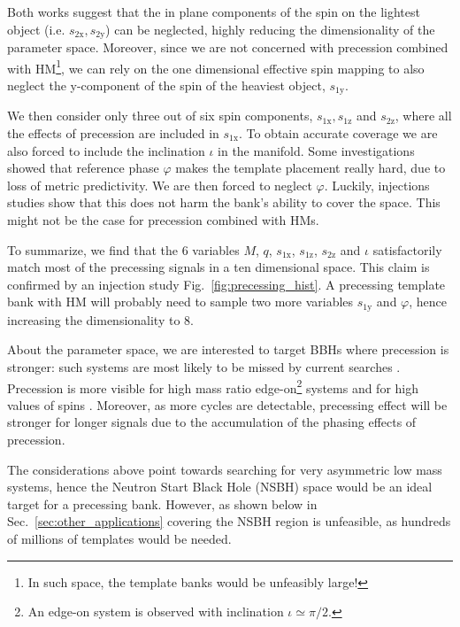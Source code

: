 \documentclass[twocolumn,showpacs,preprintnumbers,nofootinbib,prd,
superscriptaddress,10pt]{revtex4-2}
\begin{document}
Both works suggest that the in plane components of the spin on the lightest object (i.e. $s_\text{2x}, s_\text{2y}$) can be neglected, highly reducing the dimensionality of the parameter space.
Moreover, since we are not concerned with precession combined with HM\footnote{In such space, the template banks would be unfeasibly large!}, we can rely on the one dimensional effective spin mapping \cite{Schmidt:2014iyl} to also neglect the y-component of the spin of the heaviest object, $s_\text{1y}$.

We then consider only three out of six spin components, $s_\text{1x}, s_\text{1z}$ and $s_\text{2z}$, where all the effects of precession are included in $s_\text{1x}$. To obtain accurate coverage we are also forced to include the inclination $\iota$ in the manifold. Some investigations showed that reference phase $\varphi$ makes the template placement really hard, due to loss of metric predictivity.
We are then forced to neglect $\varphi$. Luckily, injections studies show that this does not harm the bank's ability to cover the space. This might not be the case for precession combined with HMs.

To summarize, we find that the $6$ variables $M$, $q$, $s_\text{1x}$, $s_\text{1z}$, $s_\text{2z}$ and $\iota$ satisfactorily match most of the precessing signals in a ten dimensional space.
This claim is confirmed by an injection study Fig.~\ref{fig:precessing_hist}.
A precessing template bank with HM will probably need to sample two more variables $s_\text{1y}$ and $\varphi$, hence increasing the dimensionality to $8$.

About the parameter space, we are interested to target BBHs where precession is stronger: such systems are most likely to be missed by current searches \cite{PhysRevD.102.041302, Fairhurst:2019vut}.
Precession is more visible for high mass ratio edge-on\footnote{An edge-on system is observed with inclination $\iota\simeq \pi/2$.} systems and for high values of spins \cite{CalderonBustillo:2016rlt}. Moreover, as more cycles are detectable, precessing effect will be stronger for longer signals due to the accumulation of the phasing effects of precession.

The considerations above point towards searching for very asymmetric low mass systems, hence the Neutron Start Black Hole (NSBH) space would be an ideal target for a precessing bank. However, as shown below in Sec.~\ref{sec:other_applications} covering the NSBH region is unfeasible, as hundreds of millions of templates would be needed.
\end{document}
